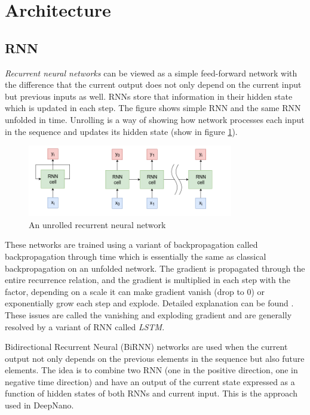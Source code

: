 \documentclass[times, utf8, diplomski, numeric, english]{fer}
\begin{document}
\section{Architecture}

\subsection{RNN}
\textit{Recurrent neural networks} can be viewed as a simple feed-forward network with the difference that the current output does not only depend on the current input but previous inputs as well. RNNs store that information in their hidden state which is updated in each step. The figure shows simple RNN and the same RNN unfolded in time.  Unrolling is a way of showing how network processes each input in the sequence and updates its hidden state (show in figure  \ref{fg:rnn}).
\begin{figure}[!ht]
	\begin{center}
		\includegraphics[width=0.8\textwidth]{./imgs/rnn.png}
		\caption{An unrolled recurrent neural network}
		\label{fg:rnn}
	\end{center}
\end{figure}

These networks are trained using a variant of backpropagation called backpropagation through time which is essentially the same as classical backpropagation on an unfolded network. The gradient is propagated through the entire recurrence relation, and the gradient is multiplied in each step with the factor, depending on a scale it can make gradient vanish (drop to 0) or exponentially grow each step and explode. Detailed explanation can be found \cite{rnn-blog}. These issues are called the vanishing and exploding gradient and are generally resolved by a variant of RNN called \textit{LSTM}\cite{hochreiter1997long}. 

Bidirectional Recurrent Neural (BiRNN) networks are used when the current output not only depends on the previous elements in the sequence but also future elements. The idea is to combine two RNN (one in the positive direction, one in negative time direction) and have an output of the current state expressed as a function of hidden states of both RNNs and current input. This is the approach used in DeepNano\cite{Boza2017}. 
\end{document}
